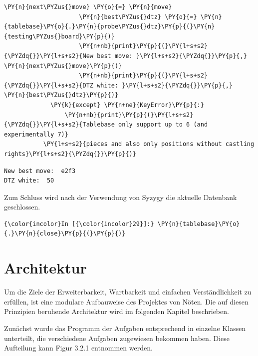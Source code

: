\begin{Verbatim}[commandchars=\\\{\}]
                     \PY{n}{next\PYZus{}move} \PY{o}{=} \PY{n}{move}
                     \PY{n}{best\PYZus{}dtz} \PY{o}{=} \PY{n}{tablebase}\PY{o}{.}\PY{n}{probe\PYZus{}dtz}\PY{p}{(}\PY{n}{testing\PYZus{}board}\PY{p}{)}
                     \PY{n+nb}{print}\PY{p}{(}\PY{l+s+s2}{\PYZdq{}}\PY{l+s+s2}{New best move: }\PY{l+s+s2}{\PYZdq{}}\PY{p}{,} \PY{n}{next\PYZus{}move}\PY{p}{)}
                     \PY{n+nb}{print}\PY{p}{(}\PY{l+s+s2}{\PYZdq{}}\PY{l+s+s2}{DTZ white: }\PY{l+s+s2}{\PYZdq{}}\PY{p}{,} \PY{n}{best\PYZus{}dtz}\PY{p}{)}
             \PY{k}{except} \PY{n+ne}{KeyError}\PY{p}{:}
                 \PY{n+nb}{print}\PY{p}{(}\PY{l+s+s2}{\PYZdq{}}\PY{l+s+s2}{Tablebase only support up to 6 (and experimentally 7)}
		   \PY{l+s+s2}{pieces and also only positions without castling rights}\PY{l+s+s2}{\PYZdq{}}\PY{p}{)}
\end{Verbatim}


    \begin{Verbatim}[commandchars=\\\{\}]
New best move:  e2f3
DTZ white:  50

    \end{Verbatim}

    Zum Schluss wird nach der Verwendung von Syzygy die aktuelle Datenbank
geschlossen.

    \begin{Verbatim}[commandchars=\\\{\}]
{\color{incolor}In [{\color{incolor}29}]:} \PY{n}{tablebase}\PY{o}{.}\PY{n}{close}\PY{p}{(}\PY{p}{)}
\end{Verbatim}



\section{Architektur}

Um die Ziele der Erweiterbarkeit, Wartbarkeit und einfachen Verständlichkeit zu erfüllen, ist eine modulare Aufbauweise des Projektes von Nöten. Die auf diesen Prinzipien beruhende Architektur wird im folgenden Kapitel beschrieben.

Zunächst wurde das Programm der Aufgaben entsprechend in einzelne Klassen unterteilt, die verschiedene Aufgaben zugewiesen bekommen haben. Diese Aufteilung kann Figur 3.2.1 entnommen werden.

